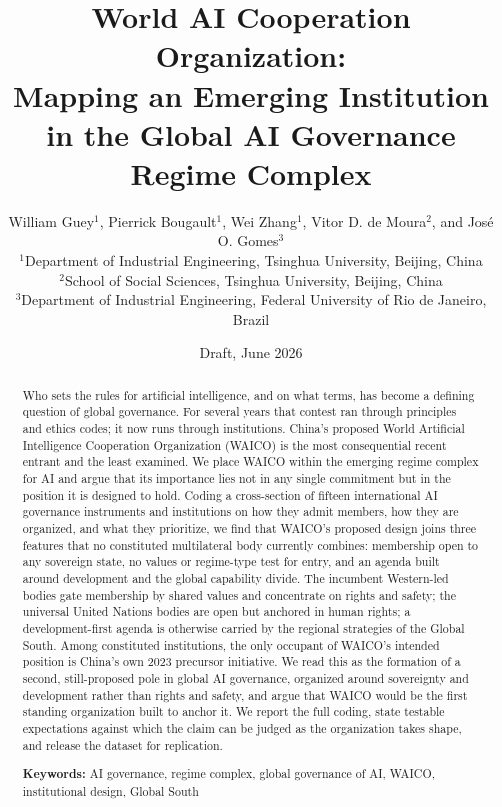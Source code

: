 \documentclass[11pt]{article}
\title{\textbf{World AI Cooperation Organization:\\Mapping an Emerging Institution in the Global AI Governance Regime Complex}}
\author{
William Guey$^{1}$, Pierrick Bougault$^{1}$, Wei Zhang$^{1}$, Vitor D. de Moura$^{2}$, and Jos\'e O. Gomes$^{3}$ \\[0.5em]
\small $^{1}$Department of Industrial Engineering, Tsinghua University, Beijing, China \\
\small $^{2}$School of Social Sciences, Tsinghua University, Beijing, China \\
\small $^{3}$Department of Industrial Engineering, Federal University of Rio de Janeiro, Brazil
}
\date{Draft, June 2026}
\begin{document}
\maketitle

\begin{abstract}
\noindent Who sets the rules for artificial intelligence, and on what terms, has become a defining question of global governance. For several years that contest ran through principles and ethics codes; it now runs through institutions. China's proposed World Artificial Intelligence Cooperation Organization (WAICO) is the most consequential recent entrant and the least examined. We place WAICO within the emerging regime complex for AI and argue that its importance lies not in any single commitment but in the position it is designed to hold. Coding a cross-section of fifteen international AI governance instruments and institutions on how they admit members, how they are organized, and what they prioritize, we find that WAICO's proposed design joins three features that no constituted multilateral body currently combines: membership open to any sovereign state, no values or regime-type test for entry, and an agenda built around development and the global capability divide. The incumbent Western-led bodies gate membership by shared values and concentrate on rights and safety; the universal United Nations bodies are open but anchored in human rights; a development-first agenda is otherwise carried by the regional strategies of the Global South. Among constituted institutions, the only occupant of WAICO's intended position is China's own 2023 precursor initiative. We read this as the formation of a second, still-proposed pole in global AI governance, organized around sovereignty and development rather than rights and safety, and argue that WAICO would be the first standing organization built to anchor it. We report the full coding, state testable expectations against which the claim can be judged as the organization takes shape, and release the dataset for replication.

\vspace{0.6em}
\noindent\textbf{Keywords:} AI governance, regime complex, global governance of AI, WAICO, institutional design, Global South
\end{abstract}

\end{document}

